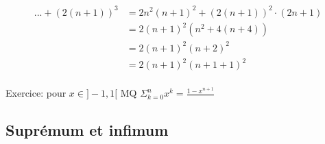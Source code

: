 \documentclass{article}
\begin{document}
\begin{equation}
    \begin{aligned}
        ... + (2(n + 1))^3 &= 2n^2(n+1)^2 + (2(n + 1))^2 \cdot (2n+ 1) \\
        &= 2(n + 1)^2(n^2 + 4(n+ 4))\\
        &= 2(n + 1)^2(n + 2)^2\\
        &= 2(n + 1)^2(n + 1 + 1)^2\\
    \end{aligned}
\end{equation}

Exercice: pour $x \in ]-1, 1[$ MQ $\Sigma_{k=0}^n x^k = \frac{1-x^{n+1}}{}$

\subsection{Suprémum et infimum}
\end{document}

